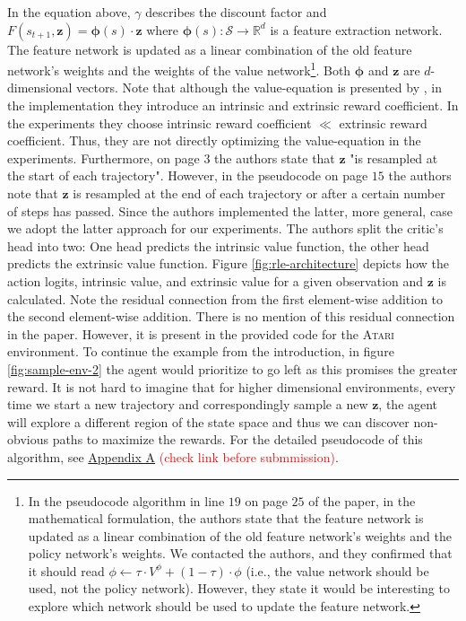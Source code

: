 \documentclass[10pt]{article} %
\begin{document}
\noindent In the equation above, $\gamma$ describes the discount factor and $F(s_{t+1}, \textbf{z}) =  \boldsymbol{\phi}(s) \cdot \textbf{z}$ where $\boldsymbol{\phi}(s): \mathcal{S} \rightarrow \mathbb{R}^{d}$ is a feature extraction network. The feature network is updated as a linear combination of the old feature network's weights and the weights of the value network\footnote{In the pseudocode algorithm in line $19$ on page $25$ of the paper, in the mathematical formulation, the authors state that the feature network is updated as a linear combination of the old feature network's weights and the policy network's weights. We contacted the authors, and they confirmed that it should read $\phi \leftarrow \tau \cdot V^\phi + (1 - \tau ) \cdot \phi$ (i.e., the value network should be used, not the policy network). However, they state it would be interesting to explore which network should be used to update the feature network.}. Both $\boldsymbol{\phi}$ and $\textbf{z}$ are $d$-dimensional vectors. Note that although the value-equation is presented by \cite{rle-paper}, in the implementation they introduce an intrinsic and extrinsic reward coefficient. In the experiments they choose intrinsic reward coefficient $\ll$ extrinsic reward coefficient. Thus, they are not directly optimizing the value-equation in the experiments. Furthermore, on page $3$ the authors state that $\textbf{z}$ "is resampled at the start of each trajectory". However, in the pseudocode on page $15$ the authors note that $\textbf{z}$ is resampled at the end of each trajectory or after a certain number of steps has passed. Since the authors implemented the latter, more general, case we adopt the latter approach for our experiments. The authors split the critic's head into two: One head predicts the intrinsic value function, the other head predicts the extrinsic value function. Figure \ref{fig:rle-architecture} depicts how the action logits, intrinsic value, and extrinsic value for a given observation and $\textbf{z}$ is calculated. Note the residual connection from the first element-wise addition to the second element-wise addition. There is no mention of this residual connection in the paper. However, it is present in the provided code for the \textsc{Atari} environment. To continue the example from the introduction, in figure \ref{fig:sample-env-2} the agent would prioritize to go left as this promises the greater reward. It is not hard to imagine that for higher dimensional environments, every time we start a new trajectory and correspondingly sample a new $\textbf{z}$, the agent will explore a different region of the state space and thus we can discover non-obvious paths to maximize the rewards. For the detailed pseudocode of this algorithm, see \hyperlink{algo-rle}{Appendix A} \textcolor{red}{(check link before submmission)}.
\end{document}
